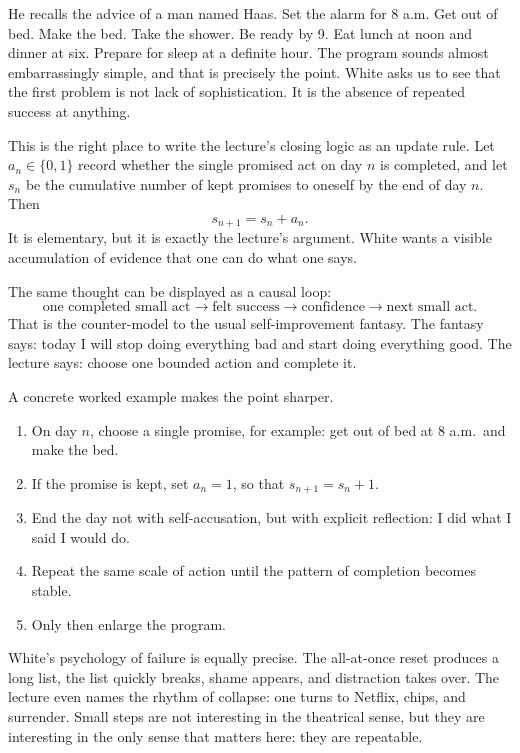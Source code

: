 He recalls the advice of a man named Haas. Set the alarm for 8 a.m. Get out of bed. Make the bed. Take the shower. Be ready by 9. Eat lunch at noon and dinner at six. Prepare for sleep at a definite hour. The program sounds almost embarrassingly simple, and that is precisely the point. White asks us to see that the first problem is not lack of sophistication. It is the absence of repeated success at anything.

This is the right place to write the lecture's closing logic as an update rule. Let \(a_n\in\{0,1\}\) record whether the single promised act on day \(n\) is completed, and let \(s_n\) be the cumulative number of kept promises to oneself by the end of day \(n\). Then
\begin{equation}
s_{n+1}=s_n+a_n.
\end{equation}
It is elementary, but it is exactly the lecture's argument. White wants a visible accumulation of evidence that one can do what one says.

The same thought can be displayed as a causal loop:
\begin{equation}
\text{one completed small act}
\to
\text{felt success}
\to
\text{confidence}
\to
\text{next small act}.
\end{equation}
That is the counter-model to the usual self-improvement fantasy. The fantasy says: today I will stop doing everything bad and start doing everything good. The lecture says: choose one bounded action and complete it.

A concrete worked example makes the point sharper.
\begin{enumerate}
\item On day \(n\), choose a single promise, for example: get out of bed at 8 a.m.\ and make the bed.
\item If the promise is kept, set \(a_n=1\), so that \(s_{n+1}=s_n+1\).
\item End the day not with self-accusation, but with explicit reflection: I did what I said I would do.
\item Repeat the same scale of action until the pattern of completion becomes stable.
\item Only then enlarge the program.
\end{enumerate}

White's psychology of failure is equally precise. The all-at-once reset produces a long list, the list quickly breaks, shame appears, and distraction takes over. The lecture even names the rhythm of collapse: one turns to Netflix, chips, and surrender. Small steps are not interesting in the theatrical sense, but they are interesting in the only sense that matters here: they are repeatable.

